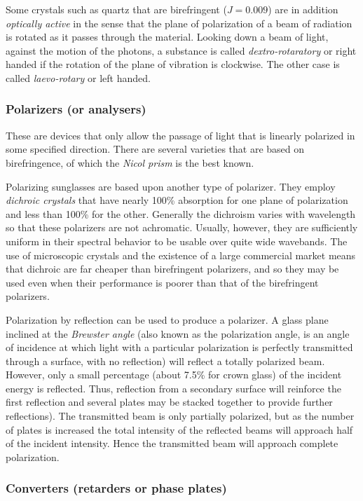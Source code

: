 \documentclass{article}
\begin{document}
Some crystals such as quartz that are birefringent ($J=0.009$) are in addition {\it optically active} in the sense that the plane of polarization of a beam of radiation is
rotated as it passes through the material. Looking down a beam of light, against the motion of the photons, a substance is called {\it dextro-rotaratory} or right handed 
if the rotation of the plane of vibration is clockwise. The other case is called {\it
laevo-rotary} or left handed. 

\subsubsection{Polarizers (or analysers)}

These are devices that only allow the passage of light that is linearly polarized in some
specified direction. There are several varieties that are based on birefringence, of which
the {\it Nicol prism} is the best known.

Polarizing sunglasses are based upon another type of polarizer. They employ {\it dichroic crystals} that have nearly 100\% absorption for one plane of polarization and less than 100\% for the other. Generally the dichroism varies with wavelength so that these polarizers are not achromatic. Usually, however, they are sufficiently uniform in their spectral behavior to be usable over quite wide wavebands. The use of microscopic crystals and the existence of a large commercial market means that dichroic are far cheaper than birefringent polarizers, and so they may be used even when their performance is poorer than that of the birefringent polarizers.

Polarization by reflection can be used to produce a polarizer. A glass plane inclined at the {\it Brewster angle} (also known as the polarization angle, is an angle of incidence at which light with a particular polarization is perfectly transmitted through a surface, with no reflection) will reflect a totally polarized beam. However, only a small percentage (about 7.5\% for crown glass) of the incident energy is reflected. Thus, reflection from a secondary surface will reinforce the first reflection and several plates may be stacked together to provide further reflections). The transmitted beam is only partially polarized, but as the number of plates is increased the total intensity of the reflected beams will approach half of the incident intensity. Hence the transmitted beam will approach complete polarization. 

\subsubsection{Converters (retarders or phase plates)}
\end{document}
